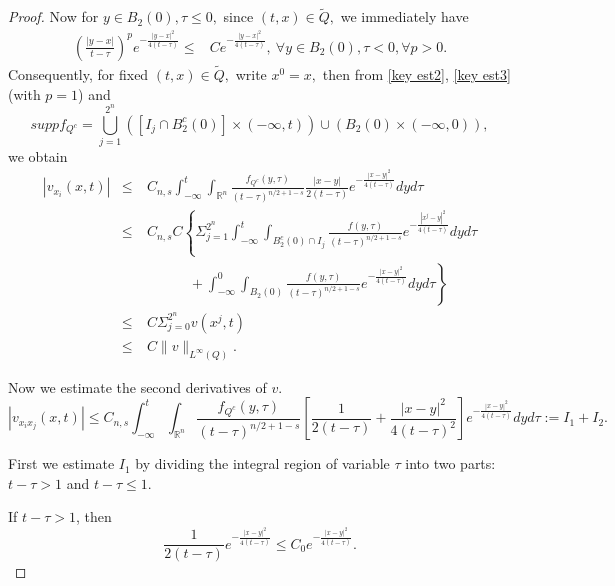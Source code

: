 \documentclass[12pt]{article}
\theoremstyle{remark}
\numberwithin{equation}{section}
\begin{document}
\begin{proof}
Now for $y\in B_2(0), \tau\leq 0,$ since $(t,x)\in \tilde{Q},$ we immediately have
\begin{eqnarray}\label{key est3}
\left(\frac{|y-x|}{t-\tau}\right)^p e^{-\frac{|y-x|^2}{4(t-\tau)}}
\leq & Ce^{-\frac{|y-x|^2}{4(t-\tau)}}, \  \forall y\in B_2(0), \tau<0, \forall p>0.
\end{eqnarray}
Consequently, for fixed $(t,x)\in \tilde{Q},$  write $x^0=x,$  then from \eqref{key est2}, \eqref{key est3} (with $p=1$) and $$supp f_{Q^c}=\bigcup_{j=1}^{2^n} \left([I_j\cap B_2^c(0)]\times(-\infty,t)\right)\cup \left(B_2(0)\times(-\infty,0)\right),$$ we obtain
 \begin{eqnarray}\label{est-vi}
|v_{x_i}(x,t)|&\leq& C_{n,s}\int_{-\infty}^t \int_{\mathbb{R}^n}  \frac{f_{Q^c}(y,\tau)}{(t-\tau)^{n/2+1-s}} \frac{|x-y|}{2(t-\tau)}e^{-\frac{|x-y|^2}{4(t-\tau)}} dy d\tau\nonumber\\
&\leq& C_{n,s}C\left\{\Sigma_{j=1}^{2^n}\int_{-\infty}^t \int_{B_2^c(0)\cap I_j}  \frac{f(y,\tau)}{(t-\tau)^{n/2+1-s}} e^{-\frac{|x^j-y|^2}{4(t-\tau)}} dy d\tau\right.\nonumber\\
&\quad& \quad\quad\quad+\left.\int_{-\infty}^0 \int_{B_2(0)}  \frac{f(y,\tau)}{(t-\tau)^{n/2+1-s}} e^{-\frac{|x-y|^2}{4(t-\tau)}} dy d\tau\right\}\nonumber\\
&\leq& C\Sigma_{j=0}^{2^n}v(x^j,t)\nonumber\\
&\leq& C\|v\|_{L^{\infty}(Q)}.\end{eqnarray}

Now we estimate the second derivatives of $v$. %
\begin{equation}\label{est-vij}
|v_{x_{i}x_{j}}(x,t)|\leq C_{n,s}\int_{-\infty}^t \int_{\mathbb{R}^n}  \frac{f_{Q^c}(y,\tau)}{(t-\tau)^{n/2+1-s}} \left[\frac{1}{2(t-\tau)} +\frac{|x-y|^2}{4(t-\tau)^2}\right]e^{-\frac{|x-y|^2}{4(t-\tau)}}dy d\tau:=I_1+I_2.
\end{equation}

First we estimate $I_1$ by dividing  the integral region of variable $\tau$ into two parts: $t-\tau>1$ and $t-\tau\leq 1.$

If $t-\tau>1$, then \begin{equation}\label{t-small}\frac{1}{2(t-\tau)} e^{-\frac{|x-y|^2}{4(t-\tau)}}\leq C_0 e^{-\frac{|x-y|^2}{4(t-\tau)}}.\end{equation}


\end{proof}
\end{document}

